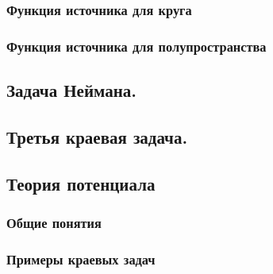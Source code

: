 \documentclass[12pt, a4paper]{article}
\begin{document}
		\subsubsection{Функция источника для круга} \label{que:24}
			 \newpage

		\subsubsection{Функция источника для полупространства}
			 \newpage


	\subsection{Задача Неймана.}\label{que:23}
		 \newpage

	\subsection{Третья краевая задача.}
		 \newpage

	\subsection{Теория потенциала}
		\subsubsection{Общие понятия}
			 \newpage

	\subsubsection{Примеры краевых задач}
		 \newpage

\end{document}
